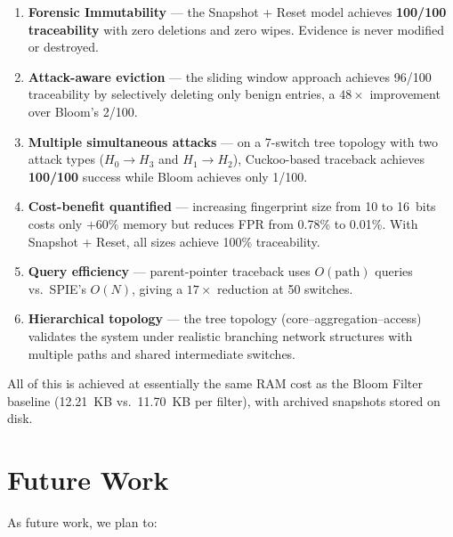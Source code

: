 \documentclass[12pt, a4paper]{report}
\begin{document}
\begin{enumerate}[leftmargin=*, label=\textbf{\arabic*.}]
  \item \textbf{Forensic Immutability} --- the Snapshot + Reset model
  achieves \textbf{100/100 traceability} with zero deletions and zero
  wipes. Evidence is never modified or destroyed.

  \item \textbf{Attack-aware eviction} --- the sliding window approach
  achieves 96/100 traceability by selectively deleting only benign
  entries, a $48\times$ improvement over Bloom's 2/100.

  \item \textbf{Multiple simultaneous attacks} --- on a 7-switch tree
  topology with two attack types ($H_0\!\to\!H_3$ and
  $H_1\!\to\!H_2$), Cuckoo-based traceback achieves \textbf{100/100}
  success while Bloom achieves only 1/100.

  \item \textbf{Cost-benefit quantified} --- increasing fingerprint
  size from 10 to 16~bits costs only $+60\%$ memory but reduces FPR
  from 0.78\% to 0.01\%. With Snapshot + Reset, all sizes achieve
  100\% traceability.

  \item \textbf{Query efficiency} --- parent-pointer traceback uses
  $O(\text{path})$ queries vs.\ SPIE's $O(N)$, giving a
  $17\times$ reduction at 50 switches.

  \item \textbf{Hierarchical topology} --- the tree topology
  (core--aggregation--access) validates the system under realistic
  branching network structures with multiple paths and shared
  intermediate switches.
\end{enumerate}

All of this is achieved at essentially the same RAM cost as the
Bloom Filter baseline (12.21~KB vs.\ 11.70~KB per filter), with
archived snapshots stored on disk.

\section{Future Work}

As future work, we plan to:
\end{document}
